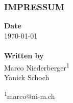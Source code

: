 \null
\vfill
\subsubsection*{IMPRESSUM}

\begin{table}[ht]
    \textbf{Date}                            \\
    \today                                   \\
                                             \\
    \textbf{Written by}                      \\
    Marco Niederberger\textsuperscript{1}    \\
    Yanick Schoch                            \\
\end{table}

{
\footnotesize
\textsuperscript{1}marco@ni-m.ch
}
